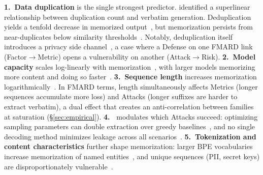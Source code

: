 \documentclass[11pt]{article}
\begin{document}
\textbf{1.~Data duplication} is the single strongest predictor.
\citet{kandpal2022deduplicatingtrainingdatamitigates} identified a superlinear
relationship between duplication count and verbatim generation.
Deduplication yields a tenfold decrease in memorized
output~\citep{lee2022deduplicating}, but memorization persists from
near-duplicates below similarity thresholds~\citep{SHSP2024}.
Notably, deduplication itself introduces a privacy side
channel~\citep{debenedetti2024privacy}, a case where a Defense on one FMARD
link (Factor$\to$Metric) opens a vulnerability on another (Attack$\to$Risk).
\textbf{2.~Model capacity} scales log-linearly with
memorization~\citep{carlini2021extractingtrainingdatalarge}, with larger
models memorizing more content and doing so
faster~\citep{tirumala2022memorizationoverfittinganalyzingtraining}.
\textbf{3.~Sequence length} increases memorization
logarithmically~\citep{carlini2023quantifyingmemorizationneurallanguage}.
In FMARD terms, length simultaneously affects Metrics (longer sequences
accumulate more loss) and Attacks (longer suffixes are harder to extract
verbatim), a dual effect that creates an anti-correlation between families at
saturation (\S\ref{sec:empirical}).
\textbf{4.~}
 modulates which
Attacks succeed: optimizing sampling parameters can double extraction over
greedy baselines~\citep{yu2023bag}, and no single decoding method minimizes
leakage across all scenarios~\citep{tiwari2025sequencelevelleakagerisktraining,
hayes2025measuringmemorizationlanguagemodels}.
\textbf{5.~Tokenization and content characteristics} further shape
memorization: larger BPE vocabularies increase memorization of named
entities~\citep{kharitonov2021bpe}, and unique sequences (PII, secret keys)
are disproportionately vulnerable~\citep{feldman2020neural}.
\end{document}
